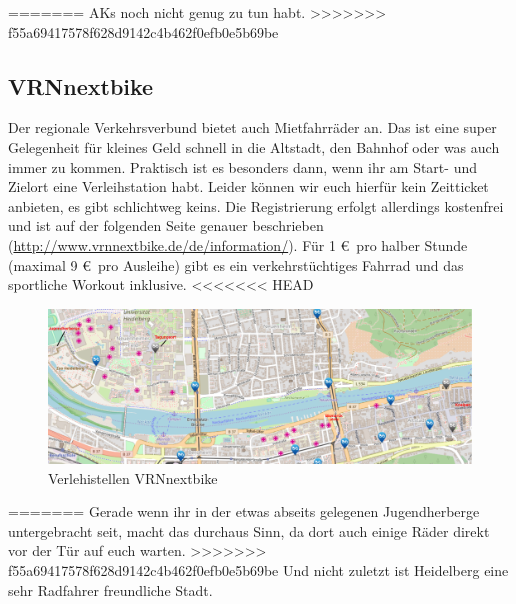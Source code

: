 =======
    AKs noch nicht genug zu tun habt.
>>>>>>> f55a69417578f628d9142c4b462f0efb0e5b69be
  \subsection{VRNnextbike}
    Der regionale Verkehrsverbund bietet auch Mietfahrräder an. Das ist eine super Gelegenheit
    für kleines Geld schnell in die Altstadt, den Bahnhof oder was auch immer zu kommen.
    Praktisch ist es besonders dann, wenn ihr am Start- und Zielort eine Verleihstation habt.
    Leider können wir euch hierfür kein Zeitticket anbieten, es gibt schlichtweg keins.
    Die Registrierung erfolgt allerdings kostenfrei und ist auf der folgenden Seite
    genauer beschrieben (\url{http://www.vrnnextbike.de/de/information/}).
    Für 1 \euro \, pro halber Stunde (maximal 9 \euro \, pro Ausleihe) gibt es ein verkehrstüchtiges
    Fahrrad und das sportliche Workout inklusive.
<<<<<<< HEAD

    \begin{figure}
      \includegraphics[width=1.0\textwidth]{chapters/mobilitaet/nextbike}
      \caption{Verlehistellen VRNnextbike}
      \label{nextbike}
    \end{figure}

=======
    Gerade wenn ihr in der etwas abseits gelegenen Jugendherberge untergebracht seit,
    macht das durchaus Sinn, da dort auch einige Räder direkt vor der Tür auf euch warten.
>>>>>>> f55a69417578f628d9142c4b462f0efb0e5b69be
    Und nicht zuletzt ist Heidelberg eine sehr Radfahrer freundliche Stadt.
